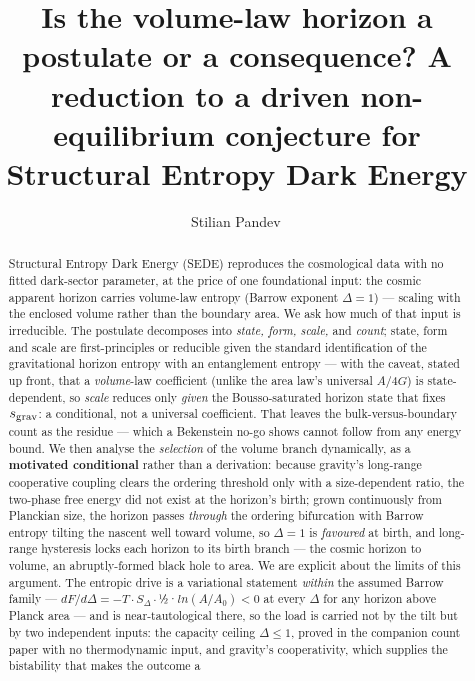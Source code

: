\documentclass[aps,prd,preprint,nofootinbib,superscriptaddress]{revtex4-2}
\begin{document}
\title{Is the volume-law horizon a postulate or a consequence? A
reduction to a driven non-equilibrium conjecture for Structural Entropy
Dark Energy}

\author{Stilian Pandev\,}

\begin{abstract}
Structural Entropy Dark Energy (SEDE) reproduces the cosmological data
with no fitted dark-sector parameter, at the price of one foundational
input: the cosmic apparent horizon carries volume-law entropy (Barrow
exponent \(\Delta  = 1\)) --- scaling with the enclosed volume rather
than the boundary area. We ask how much of that input is irreducible.
The postulate decomposes into \emph{state, form, scale,} and
\emph{count}; state, form and scale are first-principles or reducible
given the standard identification of the gravitational horizon entropy
with an entanglement entropy --- with the caveat, stated up front, that
a \emph{volume}-law coefficient (unlike the area law's universal
\(A/4G\)) is state-dependent, so \emph{scale} reduces only \emph{given}
the Bousso-saturated horizon state that fixes \(s_{\rm grav}\): a
conditional, not a universal coefficient. That leaves the
bulk-versus-boundary count as the residue --- which a Bekenstein no-go
shows cannot follow from any energy bound. We then analyse the
\emph{selection} of the volume branch dynamically, as a
\textbf{motivated conditional} rather than a derivation: because
gravity's long-range cooperative coupling clears the ordering threshold
only with a size-dependent ratio, the two-phase free energy did not
exist at the horizon's birth; grown continuously from Planckian size,
the horizon passes \emph{through} the ordering bifurcation with Barrow
entropy tilting the nascent well toward volume, so \(\Delta  = 1\) is
\emph{favoured} at birth, and long-range hysteresis locks each horizon
to its birth branch --- the cosmic horizon to volume, an abruptly-formed
black hole to area. We are explicit about the limits of this argument.
The entropic drive is a variational statement \emph{within} the assumed
Barrow family ---
\(dF/d\Delta  = -T\cdot S_\Delta \cdot\)½·\(ln(A/A_{0}) < 0\) at every
\(\Delta\) for any horizon above Planck area --- and is
near-tautological there, so the load is carried not by the tilt but by
two independent inputs: the capacity ceiling \(\Delta  \leq  1\), proved
in the companion count paper with no thermodynamic input, and gravity's
cooperativity, which supplies the bistability that makes the outcome a

\end{abstract}
\end{document}
